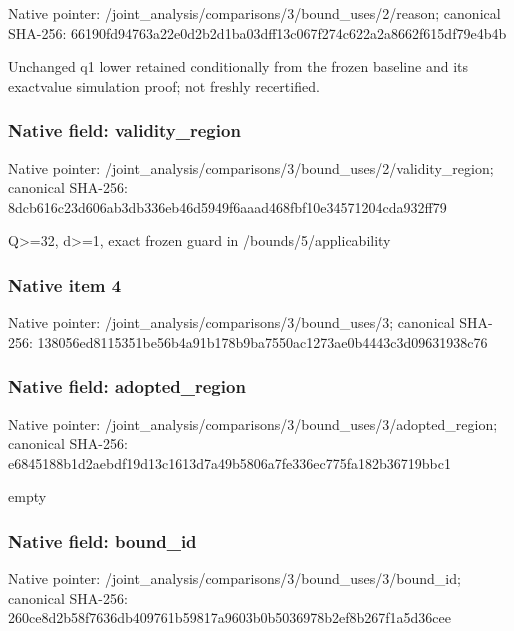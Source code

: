\documentclass[10pt,a4paper]{article}
\begin{document}
Native pointer: /joint\_analysis/comparis\allowbreak{}ons/3/bound\_uses/2/reaso\allowbreak{}n; canonical SHA-256: 66190fd94763a22e0d2b2d1b\allowbreak{}a03dff13c067f274c622a2a8\allowbreak{}662f615df79e4b4b


Unchanged q1 lower retained conditionally from the frozen baseline and its exactvalue simulation proof; not freshly recertified.


\subsubsection{Native field: validity\_region}


Native pointer: /joint\_analysis/comparis\allowbreak{}ons/3/bound\_uses/2/valid\allowbreak{}ity\_region; canonical SHA-256: 8dcb616c23d606ab3db336eb\allowbreak{}46d5949f6aaad468fbf10e34\allowbreak{}571204cda932ff79


Q>=32, d>=1, exact frozen guard in /bounds/5/applicability


\subsubsection{Native item 4}


Native pointer: /joint\_analysis/comparis\allowbreak{}ons/3/bound\_uses/3; canonical SHA-256: 138056ed8115351be56b4a91\allowbreak{}b178b9ba7550ac1273ae0b44\allowbreak{}43c3d09631938c76



\subsubsection{Native field: adopted\_region}


Native pointer: /joint\_analysis/comparis\allowbreak{}ons/3/bound\_uses/3/adopt\allowbreak{}ed\_region; canonical SHA-256: e6845188b1d2aebdf19d13c1\allowbreak{}613d7a49b5806a7fe336ec77\allowbreak{}5fa182b36719bbc1


empty


\subsubsection{Native field: bound\_id}


Native pointer: /joint\_analysis/comparis\allowbreak{}ons/3/bound\_uses/3/bound\allowbreak{}\_id; canonical SHA-256: 260ce8d2b58f7636db409761\allowbreak{}b59817a9603b0b5036978b2e\allowbreak{}f8b267f1a5d36cee
\end{document}
